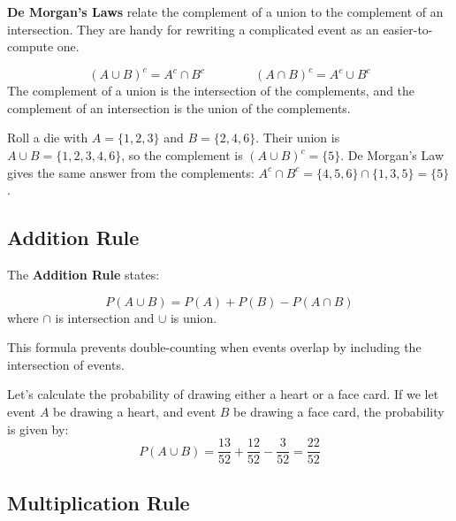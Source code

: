 \documentclass[
  11pt,
  letterpaper,
  DIV=11,
  numbers=noendperiod,
  oneside,
  open=any]{scrreprt}
\begin{document}
\textbf{De Morgan's Laws} relate the complement of a union to the
complement of an intersection. They are handy for rewriting a
complicated event as an easier-to-compute one.

\begin{bsformula}

\[(A \cup B)^c = A^c \cap B^c \qquad\qquad (A \cap B)^c = A^c \cup B^c\]
The complement of a union is the intersection of the complements, and
the complement of an intersection is the union of the complements.

\end{bsformula}

\begin{bsexample}[Example]

Roll a die with \(A=\{1,2,3\}\) and \(B=\{2,4,6\}\). Their union is
\(A \cup B=\{1,2,3,4,6\}\), so the complement is \((A \cup B)^c=\{5\}\).
De Morgan's Law gives the same answer from the complements:
\(A^c \cap B^c=\{4,5,6\} \cap \{1,3,5\}=\{5\}\).

\end{bsexample}

\subsection*{Addition Rule}\label{addition-rule}

The \textbf{Addition Rule} states:

\begin{bsformula}

\[P(A \cup B)=P(A)+P(B)-P(A \cap B)\] where \(\cap\) is intersection and
\(\cup\) is union.

\end{bsformula}

This formula prevents double-counting when events overlap by including
the intersection of events.

\begin{bsexample}[Example]

Let's calculate the probability of drawing either a heart or a face
card. If we let event \(A\) be drawing a heart, and event \(B\) be
drawing a face card, the probability is given by:
\[P(A \cup B)=\frac{13}{52}+\frac{12}{52}-\frac{3}{52}=\frac{22}{52}\]

\end{bsexample}

\subsection*{Multiplication Rule}\label{multiplication-rule}
\end{document}
